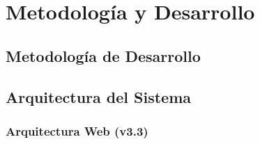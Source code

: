 
\section{Metodolog\'ia y Desarrollo}
\label{sec:metodologia}


\subsection{Metodolog\'ia de Desarrollo}
\label{subsec:metodologia-desarrollo}


\subsection{Arquitectura del Sistema}
\label{subsec:arquitectura-sistema}


\subsubsection{Arquitectura Web (v3.3)}
\label{subsubsec:arquitectura-web}


